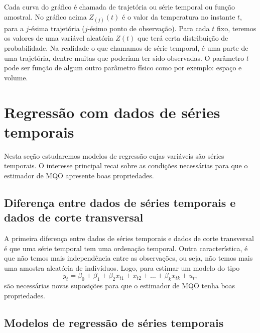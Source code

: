 \documentclass[
]{book}
\theoremstyle{definition}
\theoremstyle{definition}
\theoremstyle{definition}
\theoremstyle{remark}
\begin{document}
Cada curva do gráfico é chamada de trajetória ou série temporal ou função amostral. No gráfico acima \(Z_{(j)}(t)\) é o valor da temperatura no instante \(t\), para a \(j\)-ésima trajetória (\(j\)-ésimo ponto de observação). Para cada \(t\) fixo, teremos os valores de uma variável aleatória \(Z(t)\) que terá certa distribuição de probabilidade. Na realidade o que chamamos de série temporal, é uma parte de uma trajetória, dentre muitas que poderiam ter sido observadas. O parâmetro \(t\) pode ser função de algum outro parâmetro físico como por exemplo: espaço e volume.

\hypertarget{regressuxe3o-com-dados-de-suxe9ries-temporais}{%
\section{Regressão com dados de séries temporais}\label{regressuxe3o-com-dados-de-suxe9ries-temporais}}

Nesta seção estudaremos modelos de regressão cujas variáveis são séries temporais. O interesse principal recai sobre as condições necessárias para que o estimador de MQO apresente boas propriedades.

\hypertarget{diferenuxe7a-entre-dados-de-suxe9ries-temporais-e-dados-de-corte-transversal}{%
\subsection{Diferença entre dados de séries temporais e dados de corte transversal}\label{diferenuxe7a-entre-dados-de-suxe9ries-temporais-e-dados-de-corte-transversal}}

A primeira diferença entre dados de séries temporais e dados de corte transversal é que uma série temporal tem uma ordenação temporal. Outra característica, é que não temos mais independência entre as observações, ou seja, não temos mais uma amostra aleatória de indivíduos. Logo, para estimar um modelo do tipo
\begin{equation}
 y_t = \beta_0 + \beta_1 + \beta_2 x_{t1}+ x_{t2} + \ldots+\beta_k x_{tk}+ u_t,
 \label{eq:eq1STR}
\end{equation}
são necessárias novas suposições para que o estimador de MQO tenha boas propriedades.

\hypertarget{modelos-de-regressuxe3o-de-suxe9ries-temporais}{%
\subsection{Modelos de regressão de séries temporais}\label{modelos-de-regressuxe3o-de-suxe9ries-temporais}}
\end{document}
